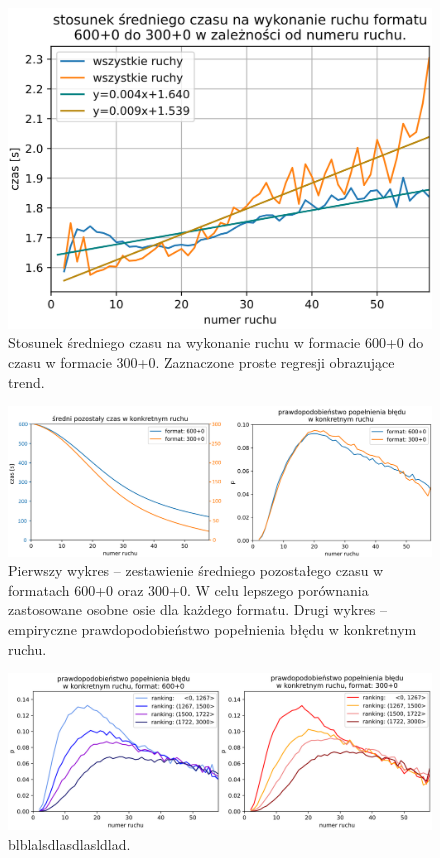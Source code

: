 \documentclass[inzynierska]{pwr_wmat_praca_dyplomowa}
\theoremstyle{plain}
\numberwithin{theorem}{chapter}
\theoremstyle{definition}
\numberwithin{theorem}{chapter}
\begin{document}
\begin{figure}[H]
	\centering
	\includegraphics[width=\textwidth]{stosunek_sr_czas.png}
	\caption{Stosunek średniego czasu na wykonanie ruchu w formacie 600+0 do czasu w formacie 300+0. Zaznaczone proste regresji obrazujące trend.}
	\label{rys:stosunek_sr_czas}
\end{figure}
\begin{figure}[H]
	\centering
	\includegraphics[width=\textwidth]{pozostaly_czas.png}
	\caption{
		Pierwszy wykres -- zestawienie średniego pozostałego czasu w formatach 600+0 oraz 300+0. W celu lepszego porównania zastosowane osobne osie dla każdego formatu. Drugi wykres -- empiryczne prawdopodobieństwo popełnienia błędu w konkretnym ruchu.}
	\label{rys:pozostaly_czas}
\end{figure}
\begin{figure}[H]
	\centering
	\includegraphics[width=\textwidth]{prawd_blad_ELO.png}
	\caption{
		blblalsdlasdlasldlad.}
	\label{rys:prawd_blad_ELO}
\end{figure}
\end{document}
